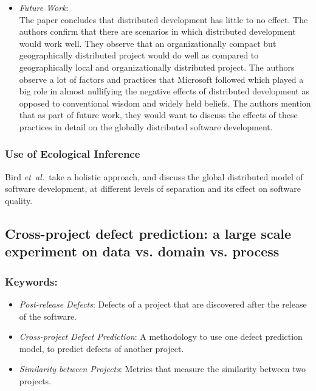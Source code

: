 \documentclass{sig-alternate-05-2015}
\newcommand{\etal}{\mbox{\emph{et al.\ }}}
\begin{document}
\begin{itemize}
\item \emph{ Future Work}: \\
The paper concludes that distributed development has little to no effect. The authors confirm that there are scenarios in which distributed development would work well. They observe that an organizationally compact but geographically distributed project would do well as compared to geographically local and organizationally distributed project. The authors observe a lot of factors and practices that Microsoft followed which played a big role in almost nullifying the negative effects of distributed development as opposed to conventional wisdom and widely held beliefs. The authors mention that as part of future work, they would want to discuss the effects of these practices in detail on the globally distributed software development.
\end{itemize}

\subsubsection{Use of Ecological Inference}
Bird \etal take a holistic approach, and discuss the global distributed model of software development, at different levels of separation and its effect on software quality.

\subsection{Cross-project defect prediction: a large scale experiment on data vs. domain vs. process \cite{Zimmerman:2009}}

\subsubsection{Keywords:}
\begin{itemize}
\item \emph{Post-release Defects}: Defects of a project that are discovered after the release of the software.
\item \emph{Cross-project Defect Prediction}: A methodology to use one defect prediction model, to predict defects of another project.
\item \emph{Similarity between Projects}: Metrics that measure the similarity between two projects.
\end{itemize} 
\end{document}
